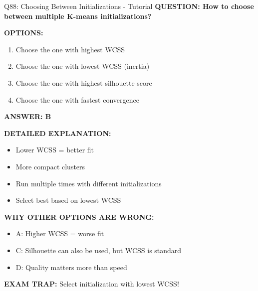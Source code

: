 \documentclass[8pt]{beamer}
\begin{document}
	\begin{frame}{Q88: Choosing Between Initializations - Tutorial}
		\fontsize{6.5}{7.5}\selectfont
		\textbf{QUESTION: How to choose between multiple K-means initializations?}
		
		\vspace{0.1cm}
		\textbf{OPTIONS:}
		\begin{enumerate}
			\item Choose the one with highest WCSS
			\item Choose the one with lowest WCSS (inertia)
			\item Choose the one with highest silhouette score
			\item Choose the one with fastest convergence
		\end{enumerate}
		
		\vspace{0.1cm}
		\textcolor{myblue}{\textbf{ANSWER: B}}
		
		\vspace{0.1cm}
		\textbf{DETAILED EXPLANATION:}
		\begin{itemize}
			\item Lower WCSS = better fit
			\item More compact clusters
			\item Run multiple times with different initializations
			\item Select best based on lowest WCSS
		\end{itemize}
		
		\vspace{0.1cm}
		\textcolor{myred}{\textbf{WHY OTHER OPTIONS ARE WRONG:}}
		\begin{itemize}
			\item \textcolor{myred}{A:} Higher WCSS = worse fit
			\item \textcolor{myred}{C:} Silhouette can also be used, but WCSS is standard
			\item \textcolor{myred}{D:} Quality matters more than speed
		\end{itemize}
		
		\textcolor{myred}{\textbf{EXAM TRAP:}} Select initialization with \textcolor{myblue}{lowest WCSS}!
	\end{frame}
	
\end{document}

